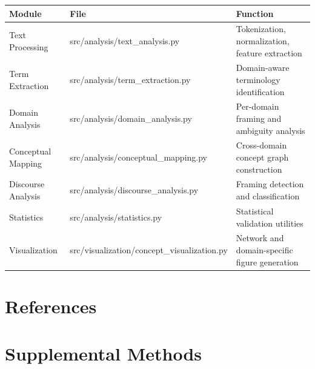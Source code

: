 \documentclass[
]{article}
\newcounter{none} %
\numberwithin{equation}{section}
\renewcommand{\texttt}[1]{%
    \colorbox{codebg}{\color{codefg}\ttfamily #1}%
}
\begin{document}
{\def\LTcaptype{none} %
\begin{longtable}[]{@{}
  >{\raggedright\arraybackslash}p{}
  >{\raggedright\arraybackslash}p{}
  >{\raggedright\arraybackslash}p{}@{}}
\toprule\noalign{}
\begin{minipage}[b]{\linewidth}\raggedright
Module
\end{minipage} & \begin{minipage}[b]{\linewidth}\raggedright
File
\end{minipage} & \begin{minipage}[b]{\linewidth}\raggedright
Function
\end{minipage} \\
\midrule\noalign{}
\endhead
\bottomrule\noalign{}
\endlastfoot
Text Processing & \texttt{src/analysis/text\_analysis.py} &
Tokenization, normalization, feature extraction \\
Term Extraction & \texttt{src/analysis/term\_extraction.py} &
Domain-aware terminology identification \\
Domain Analysis & \texttt{src/analysis/domain\_analysis.py} & Per-domain
framing and ambiguity analysis \\
Conceptual Mapping & \texttt{src/analysis/conceptual\_mapping.py} &
Cross-domain concept graph construction \\
Discourse Analysis & \texttt{src/analysis/discourse\_analysis.py} &
Framing detection and classification \\
Statistics & \texttt{src/analysis/statistics.py} & Statistical
validation utilities \\
Visualization & \texttt{src/visualization/concept\_visualization.py} &
Network and domain-specific figure generation \\
\end{longtable}
}

\newpage

\section{References}\label{sec:references}

\nocite{*}

\newpage

\section{Supplemental Methods}\label{sec:supplemental_methods}
\end{document}
